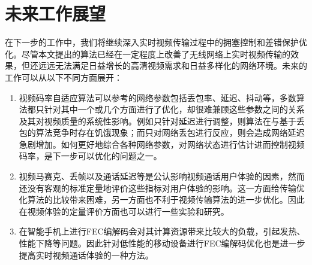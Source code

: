 \section{未来工作展望}
在下一步的工作中，我们将继续深入实时视频传输过程中的拥塞控制和差错保护优化。尽管本文提出的算法已经在一定程度上改善了无线网络上实时视频传输的效果，但还远远无法满足日益增长的高清视频需求和日益多样化的网络环境。未来的工作可以从以下不同方面展开：
\begin{enumerate}
    \item 视频码率自适应算法可以参考的网络参数包括丢包率、延迟、抖动等，多数算法都只针对其中一个或几个方面进行了优化，却很难兼顾这些参数之间的关系及其对视频质量的系统性影响。例如只针对延迟进行调整，则算法在与基于丢包的算法竞争时存在饥饿现象；而只对网络丢包进行反应，则会造成网络延迟急剧增加。如何更好地综合各种网络参数，对网络状态进行估计进而控制视频码率，是下一步可以优化的问题之一。
    \item 视频马赛克、丢帧以及通话延迟等是公认影响视频通话用户体验的因素，然而还没有客观的标准定量地评价这些指标对用户体验的影响。这一方面给传输优化算法的比较带来困难，另一方面也不利于视频传输算法的进一步优化。因此在视频体验的定量评价方面也可以进行一些实验和研究。
    \item 在智能手机上进行FEC编解码会对其计算资源带来比较大的负载，引起发热、性能下降等问题。因此针对低性能的移动设备进行FEC编解码优化也是进一步提高实时视频通话体验的一种方法。
\end{enumerate}
